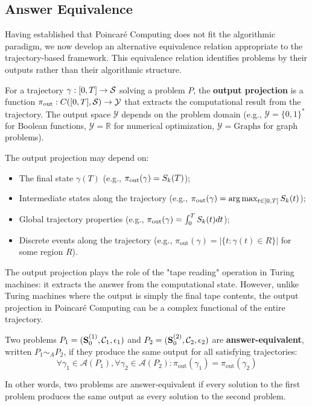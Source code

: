 \subsection{Answer Equivalence}

Having established that Poincaré Computing does not fit the algorithmic paradigm, we now develop an alternative equivalence relation appropriate to the trajectory-based framework. This equivalence relation identifies problems by their outputs rather than their algorithmic structure.

\begin{definition}
\label{def:output_projection}
For a trajectory $\gamma: [0, T] \to \mathcal{S}$ solving a problem $P$, the \textbf{output projection} is a function $\pi_{\text{out}}: C([0,T], \mathcal{S}) \to \mathcal{Y}$ that extracts the computational result from the trajectory. The output space $\mathcal{Y}$ depends on the problem domain (e.g., $\mathcal{Y} = \{0,1\}^*$ for Boolean functions, $\mathcal{Y} = \mathbb{R}$ for numerical optimization, $\mathcal{Y} = \text{Graphs}$ for graph problems).

The output projection may depend on:
\begin{itemize}
    \item The final state $\gamma(T)$ (e.g., $\pi_{\text{out}}(\gamma) = S_k(T)$);
    \item Intermediate states along the trajectory (e.g., $\pi_{\text{out}}(\gamma) = \arg\max_{t \in [0,T]} S_k(t)$);
    \item Global trajectory properties (e.g., $\pi_{\text{out}}(\gamma) = \int_0^T S_k(t) dt$);
    \item Discrete events along the trajectory (e.g., $\pi_{\text{out}}(\gamma) = |\{t : \gamma(t) \in R\}|$ for some region $R$).
\end{itemize}
\end{definition}

The output projection plays the role of the "tape reading" operation in Turing machines: it extracts the answer from the computational state. However, unlike Turing machines where the output is simply the final tape contents, the output projection in Poincaré Computing can be a complex functional of the entire trajectory.

\begin{definition}
\label{def:answer_equivalence}
Two problems $P_1 = (\mathbf{S}_0^{(1)}, \mathcal{C}_1, \epsilon_1)$ and $P_2 = (\mathbf{S}_0^{(2)}, \mathcal{C}_2, \epsilon_2)$ are \textbf{answer-equivalent}, written $P_1 \sim_A P_2$, if they produce the same output for all satisfying trajectories:
\begin{equation}
\forall \gamma_1 \in \mathcal{A}(P_1), \forall \gamma_2 \in \mathcal{A}(P_2) : \pi_{\text{out}}(\gamma_1) = \pi_{\text{out}}(\gamma_2)
\label{eq:answer_equivalence}
\end{equation}

In other words, two problems are answer-equivalent if every solution to the first problem produces the same output as every solution to the second problem.
\end{definition}

